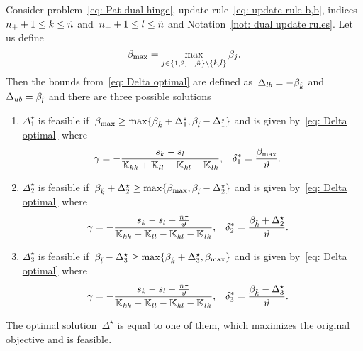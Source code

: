 \begin{lemma}\label{thm: patmat family hinge update b,b}
  Consider problem~\eqref{eq: Pat dual hinge}, update rule~\eqref{eq: update rule b,b}, indices~$n_{+} + 1 \leq k \leq \tilde{n}$ and~$n_{+} + 1 \leq l \leq \tilde{n}$ and Notation~\ref{not: dual update rules}. Let us define
  \begin{equation*}
    \beta_{\max} = \max_{j \in \{1, 2, \ldots, \tilde{n} \} \setminus \{\hat{k}, \hat{l}\}} \beta_j.
  \end{equation*}
  Then the bounds from~\eqref{eq: Delta optimal} are defined as~$\Delta_{lb} = - \beta_{\hat{k}}$ and~$\Delta_{ub} = \beta_{\hat{l}}$ and there are three possible solutions
  \begin{enumerate}
    \item $\Delta^{\star}_1$ is feasible if~$\beta_{\max} \geq \max\{\beta_{\hat{k}} + \Delta^{\star}_1, \beta_{\hat{l}} - \Delta^{\star}_1\}$ and is given by~\eqref{eq: Delta optimal} where
    \begin{align*}
      \gamma
        & = -\frac{s_k - s_l}{\mathbb{K}_{kk} + \mathbb{K}_{ll} - \mathbb{K}_{kl} - \mathbb{K}_{lk}}, &
      \delta^{*}_1
        & = \frac{\beta_{\max}}{\vartheta}.
    \end{align*}
    \item $\Delta^{\star}_2$ is feasible if~$\beta_{\hat{k}} + \Delta^{\star}_2 \geq \max\{\beta_{\max} , \beta_{\hat{l}} - \Delta^{\star}_2\}$ and is given by~\eqref{eq: Delta optimal} where
    \begin{align*}
      \gamma
        & = -\frac{s_k - s_l + \frac{\tilde{n} \tau}{\vartheta}}{\mathbb{K}_{kk} + \mathbb{K}_{ll} - \mathbb{K}_{kl} - \mathbb{K}_{lk}}, &
      \delta^{*}_2
        & = \frac{\beta_{\hat{k}} + \Delta^{\star}_2}{\vartheta}.
    \end{align*}
    \item $\Delta^{\star}_3$ is feasible if~$\beta_{\hat{l}} - \Delta^{\star}_3 \geq \max\{\beta_{\hat{k}} + \Delta^{\star}_3, \beta_{\max}\}$ and is given by~\eqref{eq: Delta optimal} where
    \begin{align*}
      \gamma
        & = -\frac{s_k - s_l - \frac{\tilde{n} \tau}{\vartheta}}{\mathbb{K}_{kk} + \mathbb{K}_{ll} - \mathbb{K}_{kl} - \mathbb{K}_{lk}}, &
      \delta^{*}_3
        & = \frac{\beta_{\hat{k}} - \Delta^{\star}_3}{\vartheta}.
    \end{align*}
  \end{enumerate}
  The optimal solution~$\Delta^{\star}$ is equal to one of them, which maximizes the original objective and is feasible.
\end{lemma}

